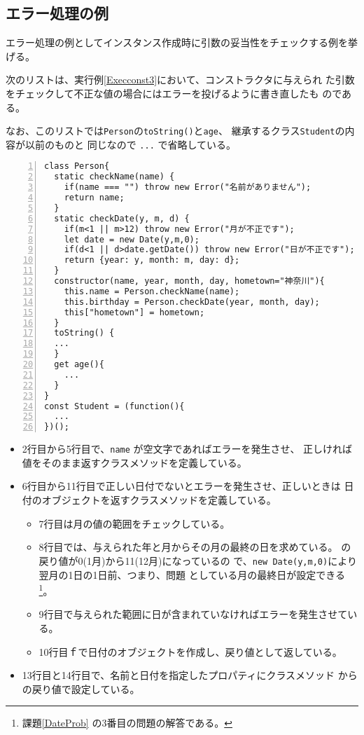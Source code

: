 \subsection{エラー処理の例}
エラー処理の例としてインスタンス作成時に引数の妥当性をチェックする例を挙げる。
 \begin{Exec}\upshape\label{throwError}
	次のリストは、実行例\ref{Execconst3}において、コンストラクタに与えられ
	た引数をチェックして不正な値の場合にはエラーを投げるように書き直したも
	のである。

	なお、このリストでは\texttt{Person}の\texttt{toString()}と\texttt{age}、
	継承するクラス\texttt{Student}の内容が以前のものと
	同じなので \texttt{...} で省略している。
 \end{Exec}
\begin{Verbatim}[numbers=left]
class Person{
  static checkName(name) {
    if(name === "") throw new Error("名前がありません");
    return name;
  }
  static checkDate(y, m, d) {
    if(m<1 || m>12) throw new Error("月が不正です");
    let date = new Date(y,m,0);
    if(d<1 || d>date.getDate()) throw new Error("日が不正です");
    return {year: y, month: m, day: d};
  }
  constructor(name, year, month, day, hometown="神奈川"){
    this.name = Person.checkName(name);
    this.birthday = Person.checkDate(year, month, day);
    this["hometown"] = hometown;
  }
  toString() {
  ...
  }
  get age(){
    ...
  }
}
const Student = (function(){
  ...
})();
\end{Verbatim}
\begin{itemize}
 \item 2行目から5行目で、\texttt{name} が空文字であればエラーを発生させ、
       正しければ値をそのまま返すクラスメソッドを定義している。
 \item 6行目から11行目で正しい日付でないとエラーを発生させ、正しいときは
       日付のオブジェクトを返すクラスメソッドを定義している。
       \begin{itemize}
        \item 7行目は月の値の範囲をチェックしている。
 \item 8行目では、与えられた年と月からその月の最終の日を求めている。
			 の戻り値が0(1月)から11(12月)になっているの
			 で、\texttt{new Date(y,m,0)}により翌月の1日の1日前、つまり、問題
			 としている月の最終日が設定できる\footnote{課題\ref{DateProb}
			 の3番目の問題の解答である。}。
 \item 9行目で与えられた範囲に日が含まれていなければエラーを発生させてい
			 る。
        \item 10行目ｆで日付のオブジェクトを作成し、戻り値として返している。
       \end{itemize}
 \item 13行目と14行目で、名前と日付を指定したプロパティにクラスメソッド
       からの戻り値で設定している。
\end{itemize}
